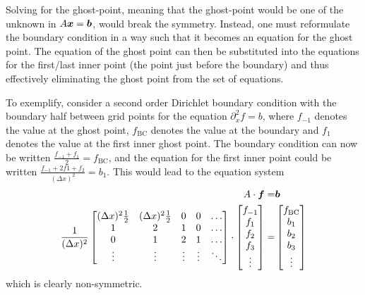 Solving for the ghost-point, meaning that the ghost-point would be one of the unknown in $A\boldsymbol{x}=\boldsymbol{b}$, would break the symmetry.
Instead, one must reformulate the boundary condition in a way such that it becomes an equation for the ghost point.
The equation of the ghost point can then be substituted into the equations for the first/last inner point (the point just before the boundary) and thus effectively eliminating the ghost point from the set of equations.

To exemplify, consider a second order Dirichlet boundary condition with the boundary half between grid points for the equation $\partial_x^2 f = b$, where $f_{-1}$ denotes the value at the ghost point, $f_{\text{BC}}$ denotes the value at the boundary and $f_{1}$ denotes the value at the first inner ghost point.
The boundary condition can now be written $\frac{f_{-1}+f_{1}}{2}=f_{\text{BC}}$, and the equation for the first inner point could be written $\frac{f_{-1}+2f{1}+f_{2}}{(\Delta x)^2}=b_1$.
This would lead to the equation system
%
\begin{align*}
    A\cdot\boldsymbol{f}=&\boldsymbol{b}\\
    \frac{1}{(\Delta x)^2}
    \begin{bmatrix}
        (\Delta x)^2\frac{1}{2} & (\Delta x)^2\frac{1}{2} & 0 & 0 & \ldots\\
        1                       & 2                       & 1 & 0 & \ldots\\
        0                       & 1                       & 2 & 1 & \ldots\\
        \vdots                  & \vdots              &\vdots&\vdots&\ddots\\
    \end{bmatrix}
    \cdot
    \begin{bmatrix}
        f_{-1}\\
        f_{1}\\
        f_{2}\\
        f_{3}\\
        \vdots
    \end{bmatrix}
    =&
    \begin{bmatrix}
        f_{\text{BC}}\\
        b_{1}\\
        b_{2}\\
        b_{3}\\
        \vdots
    \end{bmatrix}
\end{align*}
%
which is clearly non-symmetric.

